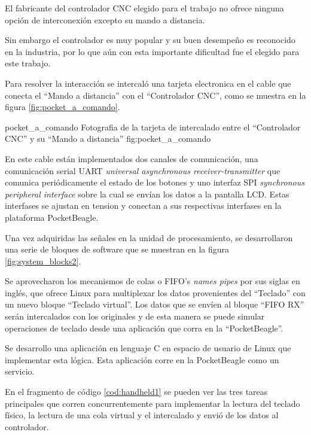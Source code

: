    El fabricante del controlador CNC elegido para el trabajo no ofrece ninguna opción de interconexión excepto su mando a distancia.\par
   Sin embargo el controlador es muy popular y su buen desempeño es reconocido en la industria, por lo que aún con esta importante dificultad fue el elegido para este trabajo. \par
   Para resolver la interacción se intercaló una tarjeta electronica en el cable que conecta el ``Mando a distancia'' con el ``Controlador CNC'', como se muestra en la figura \ref{fig:pocket_a_comando}. \par

         {pocket_a_comando}
         {Fotografia de la tarjeta de intercalado entre el ``Controlador CNC'' y su ``Mando a distancia''}
         {fig:pocket_a_comando} %

   En este cable están implementados dos canales de comunicación, una comunicación serial UART \textit{universal asynchronous receiver-transmitter} que comunica periódicamente el estado de los botones y uno interfaz SPI \textit{synchronous peripheral interface} sobre la cual se envían los datos a la pantalla LCD.
   Estas interfases se ajustan en tension y conectan a sus respectivas interfases en la plataforma PocketBeagle.\par

   Una vez adquiridas las señales en la unidad de procesamiento, se desarrollaron una serie de bloques de software que se muestran en la figura \ref{fig:system_blocks2}.\par
   Se aprovecharon los mecanismos de colas o FIFO's \textit{names pipes} por sus siglas en inglés, que ofrece Linux para multiplexar los datos provenientes del ``Teclado'' con un nuevo bloque ``Teclado virtual''.
      Los datos que se envíen al bloque ``FIFO RX'' serán intercalados con los originales y de esta manera se puede simular operaciones de teclado desde una aplicación que corra en la ``PocketBeagle''. \par
      Se desarrollo una aplicación en lenguaje C en espacio de usuario de Linux que implementar esta lógica. Esta aplicación corre en la PocketBeagle como un servicio. \par

      En el fragmento de código \ref{cod:handheld1} se pueden ver las tres tareas principales que corren concurrentemente para implementar la lectura del teclado físico, la lectura de una cola virtual y el intercalado y envió de los datos al controlador.

